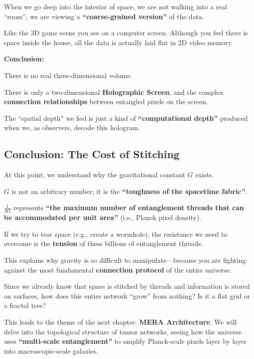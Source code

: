 When we go deep into the interior of space, we are not walking into a real ``room''; we are viewing a \textbf{``coarse-grained version''} of the data.

Like the 3D game scene you see on a computer screen. Although you feel there is space inside the house, all the data is actually laid flat in 2D video memory.

\textbf{Conclusion:}

There is no real three-dimensional volume.

There is only a two-dimensional \textbf{Holographic Screen}, and the complex \textbf{connection relationships} between entangled pixels on the screen.

The ``spatial depth'' we feel is just a kind of \textbf{``computational depth''} produced when we, as observers, decode this hologram.

\subsection{Conclusion: The Cost of Stitching}

At this point, we understand why the gravitational constant $G$ exists.

$G$ is not an arbitrary number; it is the \textbf{``toughness of the spacetime fabric''}.

$\frac{1}{4G}$ represents \textbf{``the maximum number of entanglement threads that can be accommodated per unit area''} (i.e., Planck pixel density).

If we try to tear space (e.g., create a wormhole), the resistance we need to overcome is the \textbf{tension} of these billions of entanglement threads.

This explains why gravity is so difficult to manipulate---because you are fighting against the most fundamental \textbf{connection protocol} of the entire universe.

Since we already know that space is stitched by threads and information is stored on surfaces, how does this entire network ``grow'' from nothing? Is it a flat grid or a fractal tree?

This leads to the theme of the next chapter: \textbf{MERA Architecture}. We will delve into the topological structure of tensor networks, seeing how the universe uses \textbf{``multi-scale entanglement''} to amplify Planck-scale pixels layer by layer into macroscopic-scale galaxies.

